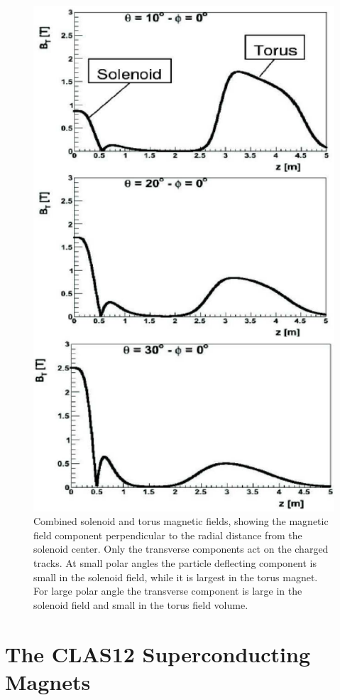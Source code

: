 \documentclass[final,3p,twocolumn]{elsarticle}
\begin{document}
\begin{figure}[htbp!]
\centerline{\includegraphics[width=0.7\columnwidth]{magfield.png}}
\caption{Combined solenoid and torus magnetic fields, showing the magnetic field component perpendicular to the
  radial distance from the solenoid center. Only the transverse components act on the charged tracks. At small polar
  angles the particle deflecting component is small in the solenoid field, while it is largest in the torus magnet. For
  large polar angle the transverse component is large in the solenoid field and small in the torus field volume.} 
\label{solenoid-torus}
\end{figure}

\section{The CLAS12 Superconducting Magnets}
\end{document}
